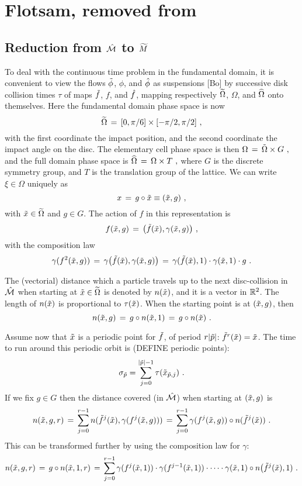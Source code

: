 \documentclass[pre,preprint,groupedaddress,showpacs,showkeys]{revtex4}
\begin{document}
\renewcommand{\thesection}{}
\section{Flotsam, removed from }


\subsection{Reduction from $\hat {{\cal M}}$ to ${\widetilde M}$}


To deal with the continuous time problem in the fundamental domain, it is
convenient to view the flows $\tilde \phi$, $\phi$, and $\hat \phi$
as suspensions [Bo] by successive disk collision times $\tau$
of maps $\tilde f$, $f$, and $\hat f$,
mapping respectively $\widetilde\Omega$, $\Omega$, and $\widehat\Omega$ onto themselves. Here
the fundamental domain phase space is now
$$
\widetilde\Omega  \,=\,   [0,\pi/6] \times [-\pi/2,\pi/2]~,
$$
with the first coordinate the impact position, and the second
coordinate the impact angle on the disc.
The elementary cell phase space is then
$
\Omega \,=\,  \tilde \Omega \times G~,
$
and the full domain phase space is
$
\widehat\Omega \,=\,   \Omega \times T~,
$
where $G$ is the discrete symmetry group, and $T$ is the translation group of
the lattice.
We can write $\xi\in \Omega$ uniquely as
$$
x \,=\,  g\circ \tilde{x} \equiv (\tilde{x},g)~,
$$
with $\tilde{x}\in\widetilde\Omega$ and $g\in G$.
The action of $f$ in this representation is
$$
f(\tilde{x},g) \,=\,  \bigl (\tilde f(\tilde{x}), \gamma(\tilde{x},g)\bigr )~,
$$
with the composition law
$$
\gamma(f^2(\tilde{x},g)) \,=\,  \gamma\bigl (\tilde f(\tilde{x}),\gamma(\tilde{x},g)\bigr ) \,=\,
\gamma(\tilde f(\tilde{x}),1)\cdot \gamma(\tilde{x},1)\cdot g~.
$$

The (vectorial) distance which a particle travels up to the next
disc-collision in $\hat {{\cal M}}$ when starting
at $\tilde{x}\in\widetilde\Omega$ is denoted by $n(\tilde{x})$, and it is a vector in $\mathbb{R}^2$.
The length of $n(\tilde{x})$ is proportional to $\tau(\tilde{x})$.
When the starting point is at $(\tilde{x},g)$, then
$$
n(\tilde{x},g) \,=\,   g\circ n(\tilde{x},1) \,=\,  g\circ n(\tilde{x})~.
$$

Assume now that $\tilde{x}$ is a periodic point for $\tilde f$,
of period $r|\tilde p|$:
$\tilde f^r(\tilde{x})=\tilde{x}$.
The time to run around this periodic orbit is
(DEFINE periodic points):
$$
\sigma_{\tilde{p}}= \sum_{j=0}^{|\tilde p|-1} \tau (\tilde{x}_{\tilde p,j})~.
$$
If we fix $g\in G$ then
the distance covered (in $\hat {{\cal M}}$) when starting at $(\tilde{x},g)$ is
$$
n(\tilde{x},g,r) \,=\, \sum_{j=0}^{r-1} n(\tilde f^j(\tilde{x}),\gamma(
f^j(\tilde{x},g))) \,=\,
                   \sum_{j=0}^{r-1} \gamma( f^j(\tilde{x},g))\circ n(\tilde
f^j(\tilde{x}))~.
$$
This can be transformed further by using the composition law for $\gamma$:$$
n(\tilde{x},g,r) \,=\,  g \circ n(\tilde{x},1,r) \,=\,
\sum_{j=0}^{r-1}
\gamma (f^j(\tilde{x},1))\cdot
\gamma (f^{j-1}(\tilde{x},1))\cdot\dots\cdot
\gamma (\tilde{x},1)\circ n\bigl (\tilde f^j(\tilde{x}),1)~.
$$
\end{document}
